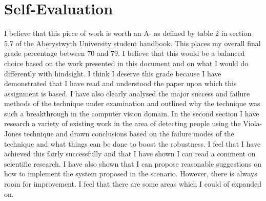 \documentclass[conference]{IEEEtran}
\begin{document}
\section{Self-Evaluation} \label{sec:self-evaluation}
I believe that this piece of work is worth an A- as defined by table 2 in section 5.7 of the Aberystwyth University student handbook. This places my overall final grade percentage between 70 and 79. I believe that this would be a balanced choice based on the work presented in this document and on what I would do differently with hindsight. I think I deserve this grade because I have demonstrated that I have read and understood the paper upon which this assignment is based. I have also clearly analysed the major success and failure methods of the technique under examination and outlined why the technique was such a breakthrough in the computer vision domain. In the second section I have research a variety of existing work in the area of detecting people using the Viola-Jones technique and drawn conclusions based on the failure modes of the technique and what things can be done to boost the robustness. I feel that I have achieved this fairly successfully and that I have shown I can read a comment on scientific research. I have also shown that I can propose reasonable suggestions on how to implement the system proposed in the scenario. However, there is always room for improvement. I feel that there are some areas which I could of expanded on.






%
%
%



\end{document}
